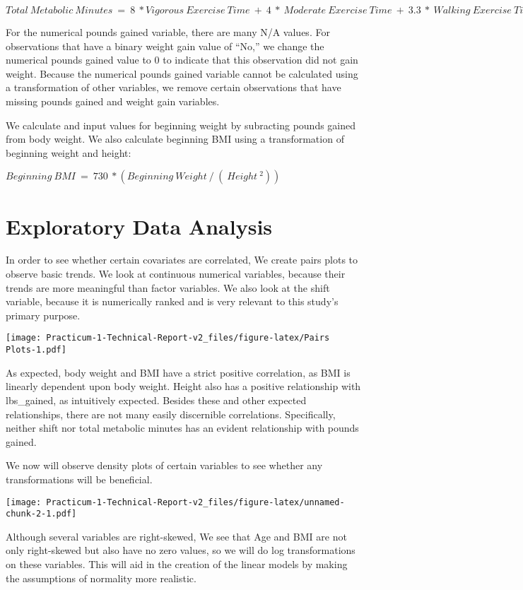 \documentclass[]{article}
\begin{document}
\(Total\:Metabolic\:Minutes\:=\:8\:*Vigorous\:Exercise\:Time\:+\:4\:*\:Moderate\:Exercise\:Time\:+\:3.3\:*\:Walking\:Exercise\:Time\)

For the numerical pounds gained variable, there are many N/A values. For
observations that have a binary weight gain value of ``No,'' we change
the numerical pounds gained value to 0 to indicate that this observation
did not gain weight. Because the numerical pounds gained variable cannot
be calculated using a transformation of other variables, we remove
certain observations that have missing pounds gained and weight gain
variables.

We calculate and input values for beginning weight by subracting pounds
gained from body weight. We also calculate beginning BMI using a
transformation of beginning weight and height:

\(Beginning\:BMI\:=\:730\:*(Beginning\:Weight\:/\:(\:Height\:^2))\)

\hypertarget{exploratory-data-analysis}{%
\section{Exploratory Data Analysis}\label{exploratory-data-analysis}}

In order to see whether certain covariates are correlated, We create
pairs plots to observe basic trends. We look at continuous numerical
variables, because their trends are more meaningful than factor
variables. We also look at the shift variable, because it is numerically
ranked and is very relevant to this study's primary purpose.

\texttt{[image: Practicum-1-Technical-Report-v2\_files/figure-latex/Pairs Plots-1.pdf]}

As expected, body weight and BMI have a strict positive correlation, as
BMI is linearly dependent upon body weight. Height also has a positive
relationship with lbs\_gained, as intuitively expected. Besides these
and other expected relationships, there are not many easily discernible
correlations. Specifically, neither shift nor total metabolic minutes
has an evident relationship with pounds gained.

We now will observe density plots of certain variables to see whether
any transformations will be beneficial.

\texttt{[image: Practicum-1-Technical-Report-v2\_files/figure-latex/unnamed-chunk-2-1.pdf]}

Although several variables are right-skewed, We see that Age and BMI are
not only right-skewed but also have no zero values, so we will do log
transformations on these variables. This will aid in the creation of the
linear models by making the assumptions of normality more realistic.
\end{document}
